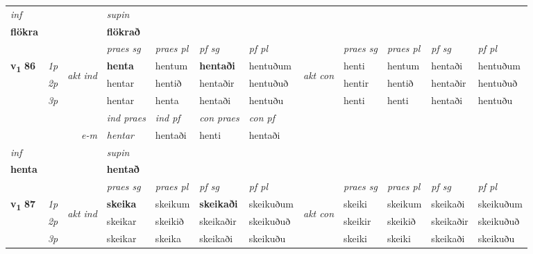 \begin{longtable}[l]{X>{\footnotesize\itshape}llXXXXlXXXX}
\cmidrule{4-7}
   {\textit{inf}} & &      & \textit{supin}   \\*
  {\textbf{flökra}} & &      &  \textbf{flökrað}   \\*

\midrule

 & &   & \textit{praes sg}  & \textit{praes pl}    & \textit{ pf sg} & \textit{pf pl} & & \textit{praes sg}  & \textit{praes pl}    & \textit{pf sg} & \textit{pf pl }  \\ \cmidrule{4-7} \cmidrule{9-12}
 \multirow{2}{*}{{{\textbf{v{\textsubscript{1}}} \Large{\textbf{86}}}}}  & 1p & \multirow{3}{*}{\begin{turn}{90}\textit{akt ind}\end{turn}} & \textbf{henta} & hentum & \textbf{hentaði} & hentuðum & \multirow{3}{*}{\begin{turn}{90}\textit{akt con}\end{turn}} &henti & hentum & hentaði & hentuðum\\*
 & 2p &  &  hentar  & hentið & hentaðir & hentuðuð & & hentir & hentið & hentaðir & hentuðuð \\*
 & 3p &  & hentar & henta & hentaði & hentuðu & & henti & henti& hentaði & hentuðu \\*
\cmidrule{4-7} \cmidrule{9-12}

   && &  \textit{ind praes} & \textit{ind pf} & \textit{con praes} & \textit{con pf} \\*
\multicolumn{3}{r}{\textit{e-m}} & hentar & hentaði & henti & hentaði \\*

\cmidrule{4-7}
   {\textit{inf}} & &      & \textit{supin}   \\*
  {\textbf{henta}} & &      &  \textbf{hentað}   \\*

\midrule

 & &   & \textit{praes sg}  & \textit{praes pl}    & \textit{ pf sg} & \textit{pf pl} & & \textit{praes sg}  & \textit{praes pl}    & \textit{pf sg} & \textit{pf pl }  \\ \cmidrule{4-7} \cmidrule{9-12}
 \multirow{2}{*}{{{\textbf{v{\textsubscript{1}}} \Large{\textbf{87}}}}}  & 1p & \multirow{3}{*}{\begin{turn}{90}\textit{akt ind}\end{turn}} & \textbf{skeika} & skeikum & \textbf{skeikaði} & skeikuðum & \multirow{3}{*}{\begin{turn}{90}\textit{akt con}\end{turn}} &skeiki & skeikum & skeikaði & skeikuðum\\*
 & 2p &  &  skeikar  & skeikið & skeikaðir & skeikuðuð & & skeikir & skeikið & skeikaðir & skeikuðuð \\*
 & 3p &  & skeikar & skeika & skeikaði & skeikuðu & & skeiki & skeiki& skeikaði & skeikuðu \\*
\cmidrule{4-7} \cmidrule{9-12}


\end{longtable}
